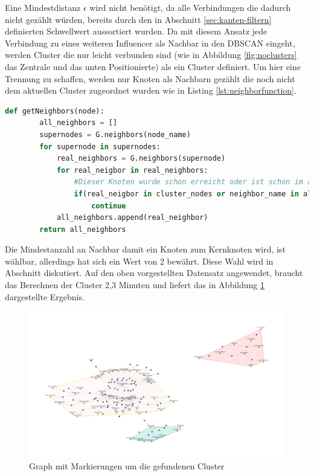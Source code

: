 Eine Mindestdistanz $\epsilon$ wird nicht benötigt, da alle Verbindungen die dadurch nicht gezählt würden, bereits durch den in Abschnitt \ref{sec:kanten-filtern} definierten Schwellwert aussortiert wurden.
Da mit diesem Ansatz jede Verbindung zu eines weiteren Influencer als Nachbar in den DBSCAN eingeht, werden \gls{Cluster} die nur leicht verbunden sind (wie in Abbildung \ref{fig:noclusters} das Zentrale und das unten Positionierte) als ein \gls{Cluster} definiert. 
Um hier eine Trennung zu schaffen, werden nur Knoten als Nachbarn gezählt die noch nicht dem aktuellen \gls{Cluster} zugeordnet wurden wie in Listing \ref{lst:neighborfunction}.
\begin{lstlisting}[language=Python,caption={Abwandlung der DBSCAN Nachbarfunktion},label={lst:neighborfunction}]
	def getNeighbors(node):
		all_neighbors = []
		supernodes = G.neighbors(node_name)
		for supernode in supernodes:
			real_neighbors = G.neighbors(supernode)
			for real_neigbor in real_neighbors:
				#Dieser Knoten wurde schon erreicht oder ist schon im aktuellen Cluster
				if(real_neigbor in cluster_nodes or neighbor_name in all_neighbors):
					continue
			all_neighbors.append(real_neighbor)
		return all_neighbors
\end{lstlisting}
Die Mindestanzahl an Nachbar damit ein Knoten zum Kernknoten wird, ist wählbar, allerdings hat sich ein Wert von 2 bewährt. Diese Wahl wird in Abschnitt diskutiert.
Auf den oben vorgestellten Datensatz angewendet, braucht das Berechnen der \gls{Cluster} 2,3 Minuten und liefert das in Abbildung \ref{fig:clustersscreenshot} dargestellte Ergebnis.
\begin{figure}[h!]
	\centering
	\includegraphics[width=\linewidth]{images/Clusters_screenshot}
	\caption[]{Graph mit Markierungen um die gefundenen \gls{Cluster}}
	\label{fig:clustersscreenshot}
\end{figure}

